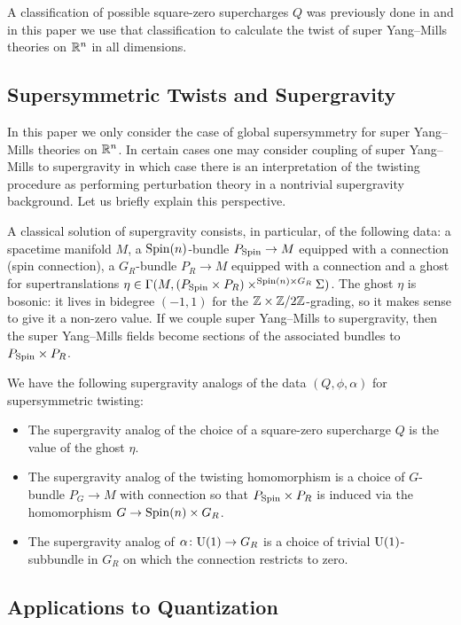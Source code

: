 \documentclass[10pt, oneside]{article}
\begin{document}
A classification of possible square-zero supercharges $Q$ was previously done in \cite{ElliottSafronov} and in this paper we use that classification to calculate the twist of super Yang--Mills theories on $\mathbb R^n$ in all dimensions.

\subsection*{Supersymmetric Twists and Supergravity}

In this paper we only consider the case of global supersymmetry for super Yang--Mills theories on $\mathbb R^n$. 
In certain cases one may consider coupling of super Yang--Mills to supergravity in which case there is an interpretation of the twisting procedure as performing perturbation theory in a nontrivial supergravity background. 
Let us briefly explain this perspective.

A classical solution of supergravity consists, in particular, of the following data: a spacetime manifold $M$, a $\mathrm{Spin}(n)$-bundle $P_{\mathrm{Spin}}\rightarrow M$ equipped with a connection (spin connection), a $G_R$-bundle $P_R\rightarrow M$ equipped with a connection and a ghost for supertranslations $\eta\in \Gamma(M, (P_{\mathrm{Spin}}\times P_R)\times^{\mathrm{Spin}(n)\times G_R}\Sigma)$.  
The ghost $\eta$ is bosonic: it lives in bidegree $(-1,1)$ for the $\mathbb Z \times \mathbb Z/2\mathbb Z$-grading, so it makes sense to give it a non-zero value.  
If we couple super Yang--Mills to supergravity, then the super Yang--Mills fields become sections of the associated bundles to $P_{\mathrm{Spin}}\times P_R$.

We have the following supergravity analogs of the data $(Q, \phi, \alpha)$ for supersymmetric twisting:
\begin{itemize}
\item The supergravity analog of the choice of a square-zero supercharge $Q$ is the value of the ghost $\eta$.

\item The supergravity analog of the twisting homomorphism is a choice of $G$-bundle $P_G\rightarrow M$ with connection so that $P_{\mathrm{Spin}}\times P_R$ is induced via the homomorphism $G\rightarrow \mathrm{Spin}(n)\times G_R$.

\item The supergravity analog of $\alpha\colon \mathrm{U}(1)\rightarrow G_R$ is a choice of trivial $\mathrm{U}(1)$-subbundle in $G_R$ on which the connection restricts to zero.
\end{itemize}

\subsection*{Applications to Quantization}
\end{document}
